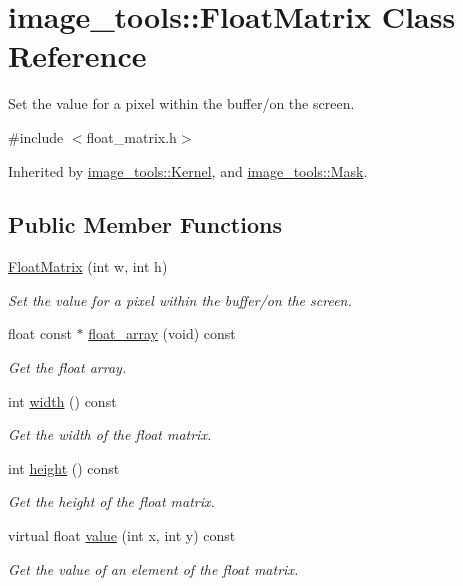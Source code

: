 \hypertarget{classimage__tools_1_1FloatMatrix}{}\section{image\+\_\+tools\+:\+:Float\+Matrix Class Reference}
\label{classimage__tools_1_1FloatMatrix}


Set the value for a pixel within the buffer/on the screen.  




{\ttfamily \#include $<$float\+\_\+matrix.\+h$>$}



Inherited by \hyperlink{classimage__tools_1_1Kernel}{image\+\_\+tools\+::\+Kernel}, and \hyperlink{classimage__tools_1_1Mask}{image\+\_\+tools\+::\+Mask}.

\subsection*{Public Member Functions}
\begin{DoxyCompactItemize}
\item 
\hyperlink{classimage__tools_1_1FloatMatrix_a98708d33731113bdd36d59698ff77418}{Float\+Matrix} (int w, int h)\hypertarget{classimage__tools_1_1FloatMatrix_a98708d33731113bdd36d59698ff77418}{}\label{classimage__tools_1_1FloatMatrix_a98708d33731113bdd36d59698ff77418}

\begin{DoxyCompactList}\small\item\em Set the value for a pixel within the buffer/on the screen. \end{DoxyCompactList}\item 
float const $\ast$ \hyperlink{classimage__tools_1_1FloatMatrix_aaa3e2ed3de0582b4411c5b48e524181e}{float\+\_\+array} (void) const 
\begin{DoxyCompactList}\small\item\em Get the float array. \end{DoxyCompactList}\item 
int \hyperlink{classimage__tools_1_1FloatMatrix_af4020870b09ec5b6bf90776e52fbc8b3}{width} () const 
\begin{DoxyCompactList}\small\item\em Get the width of the float matrix. \end{DoxyCompactList}\item 
int \hyperlink{classimage__tools_1_1FloatMatrix_aa053954b03eb71794f0e6eeeb0567f19}{height} () const 
\begin{DoxyCompactList}\small\item\em Get the height of the float matrix. \end{DoxyCompactList}\item 
virtual float \hyperlink{classimage__tools_1_1FloatMatrix_ab376dde20ee04b3ed91b033e92f8f5c7}{value} (int x, int y) const 
\begin{DoxyCompactList}\small\item\em Get the value of an element of the float matrix. \end{DoxyCompactList}\end{DoxyCompactItemize}
